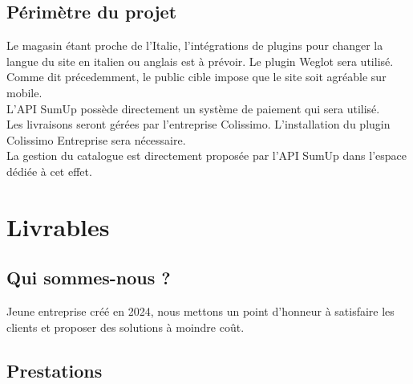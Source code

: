 \documentclass[a4paper, 12pt]{article}
\begin{document}
\subsection{Périmètre du projet}
Le magasin étant proche de l'Italie, l'intégrations de plugins pour changer la langue du site en italien ou anglais est à prévoir. Le plugin Weglot sera utilisé.\\

Comme dit précedemment, le public cible impose que le site soit agréable sur mobile.\\

L'API SumUp possède directement un système de paiement qui sera utilisé.\\

Les livraisons seront gérées par l'entreprise Colissimo. L'installation du plugin Colissimo Entreprise sera nécessaire.\\

La gestion du catalogue est directement proposée par l'API SumUp dans l'espace dédiée à cet effet.
\newpage
\section{Livrables}
\subsection{Qui sommes-nous ?}
Jeune entreprise créé en 2024, nous mettons un point d'honneur à satisfaire les clients et proposer des solutions à moindre coût.
\subsection{Prestations}

\begin{landscape}
    
\end{landscape}
\end{document}
